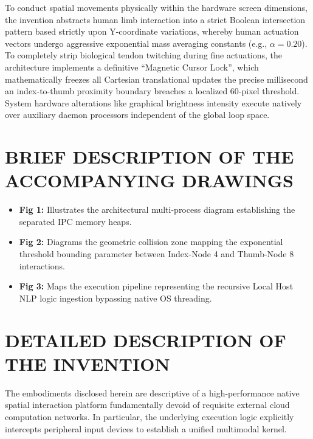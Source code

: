 \documentclass[12pt, a4paper]{article}
\begin{document}
To conduct spatial movements physically within the hardware screen dimensions, the invention abstracts human limb interaction into a strict Boolean intersection pattern based strictly upon Y-coordinate variations, whereby human actuation vectors undergo aggressive exponential mass averaging constants (e.g., $\alpha = 0.20$). To completely strip biological tendon twitching during fine actuations, the architecture implements a definitive ``Magnetic Cursor Lock'', which mathematically freezes all Cartesian translational updates the precise millisecond an index-to-thumb proximity boundary breaches a localized 60-pixel threshold. System hardware alterations like graphical brightness intensity execute natively over auxiliary daemon processors independent of the global loop space.

\section*{BRIEF DESCRIPTION OF THE ACCOMPANYING DRAWINGS}
\begin{itemize}
    \item \textbf{Fig 1:} Illustrates the architectural multi-process diagram establishing the separated IPC memory heaps.
    \item \textbf{Fig 2:} Diagrams the geometric collision zone mapping the exponential threshold bounding parameter between Index-Node 4 and Thumb-Node 8 interactions.
    \item \textbf{Fig 3:} Maps the execution pipeline representing the recursive Local Host NLP logic ingestion bypassing native OS threading.
\end{itemize}

\section*{DETAILED DESCRIPTION OF THE INVENTION}
The embodiments disclosed herein are descriptive of a high-performance native spatial interaction platform fundamentally devoid of requisite external cloud computation networks. In particular, the underlying execution logic explicitly intercepts peripheral input devices to establish a unified multimodal kernel. 
\end{document}
